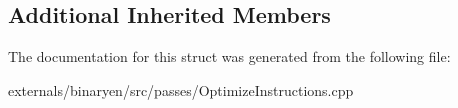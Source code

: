 \subsection*{Additional Inherited Members}


The documentation for this struct was generated from the following file\+:\begin{DoxyCompactItemize}
\item 
externals/binaryen/src/passes/Optimize\+Instructions.\+cpp\end{DoxyCompactItemize}
